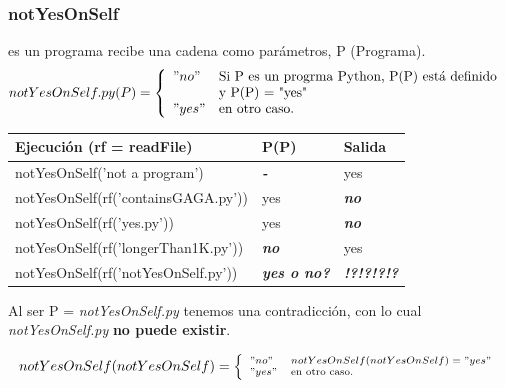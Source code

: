 \documentclass[xcolor=table]{beamer}
\begin{document}
\begin{frame}  \frametitle{notYesOnSelf}  \scriptsize  

es un programa recibe una cadena como parámetros,  P (Programa). 
\begin{equation}
     \label{ew:notYesOnSelf}
     notYesOnSelf.py (P) =  \left\{
	       \begin{array}{ll}
		 "no"      & \text{Si P es un progrma Python, P(P) está definido } \\
                     &   \text{y P(P) = "yes"} \\
		 "yes"       & \text{en otro caso.} \\
	       \end{array}
	     \right.
   \end{equation}


    \begin{table}[]
    \begin{tabular}{|l|l|l|}
    \hline
    \rowcolor[HTML]{EFEFEF} 
    {\color[HTML]{000000} \textbf{Ejecución (rf = readFile)}} & {\color[HTML]{000000} \textbf{P(P)}}   & {\color[HTML]{000000} \textbf{Salida}}             \\ \hline\hline
    notYesOnSelf('not a program')   & \color[HTML]{FE0000} \textit{\textbf{-}}  & yes  \\ \hline\hline
    notYesOnSelf(rf('containsGAGA.py'))     & yes        & \color[HTML]{FE0000} \textit{\textbf{no}} \\ \hline\hline
    notYesOnSelf(rf('yes.py'))                & yes      & \color[HTML]{FE0000} \textit{\textbf{no}} \\ \hline\hline
    notYesOnSelf(rf('longerThan1K.py')) & \color[HTML]{FE0000} \textit{\textbf{no}} & yes \\ \hline\hline
    notYesOnSelf(rf('notYesOnSelf.py'))  & \color[HTML]{FE0000} \textit{\textbf{yes o no?}}  & \color[HTML]{FE0000} \textit{\textbf{!?!?!?!?}}  \\ \hline
    \end{tabular}
\end{table}

Al ser P = \textit{notYesOnSelf.py} tenemos una contradicción, con lo cual \textit{notYesOnSelf.py} \large{\textbf{no puede existir}}.
\begin{center}

\begin{equation}\scriptsize  
     \label{eq:notYesOnSelf}
     notYesOnSelf (notYesOnSelf) =  \left\{
	       \begin{array}{ll}
		 "no"      & notYesOnSelf (notYesOnSelf) = "yes" \\
		 "yes"     & \text{en otro caso.} \\
	       \end{array}
	     \right.
   \end{equation}
   
\end{center}
\end{frame} 
\end{document}
